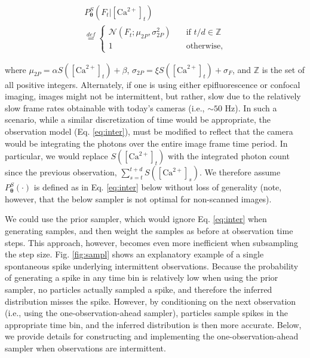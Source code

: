 \documentclass[10pt]{article}
\providecommand{\ve}[1]{\boldsymbol{#1}}
\providecommand{\ve}[1]{\boldsymbol{#1}}
\newcommand{\thetn}{\ve{\theta}}
\newcommand{\p}{P_{\thetn}}
\newcommand{\Ca}{[\text{Ca}^{2+}]}
\begin{document}
\begin{multline}\label{eq:inter}
\p^S(F_t|\Ca_t) \\ \overset{def}{=}
\begin{cases}
\mathcal{N}(F_t; \mu_{2P}, \sigma_{2P}^2) &\quad \text{if } t/d \in \mathbb{Z}\\
1 &\quad \text{otherwise,}
\end{cases}
\end{multline} 

\noindent where $\mu_{2P}= \alpha  S(\Ca_t) + \beta$, $\sigma_{2P}=\xi S(\Ca_t) + \sigma_F$, and  $\mathbb{Z}$ is the set of all positive integers.  Alternately, if one is using either epifluorescence or confocal imaging, images might not be intermittent, but rather, slow due to the relatively slow frame rates obtainable with today's cameras (i.e., $\sim 50$ Hz).  In such a scenario, while a similar discretization of time would be appropriate, the observation model (Eq. \ref{eq:inter}), must be modified to reflect that the camera would be integrating the photons over the entire image frame time period.  
%
%
In particular, we would replace $S(\Ca_t)$ with the integrated photon count since the previous observation, $\sum_{s=t}^{t+d} S(\Ca_s)$.  
We therefore assume $\p^S(\cdot)$ is defined as in Eq. \ref{eq:inter} below without loss of generality (note, however, that the below sampler is not optimal for non-scanned images). %

We could use the prior sampler, which would ignore Eq. \ref{eq:inter} when generating samples, and then weight the samples as before at observation time steps.  This approach, however, becomes even more inefficient when subsampling the step size.  Fig. \ref{fig:sampl} shows an explanatory example of a single spontaneous spike underlying intermittent observations. Because the probability of generating a spike in any time bin is relatively low when using the prior sampler, no particles actually sampled a spike, and therefore the inferred distribution misses the spike. %
However, by conditioning on the next observation (i.e., using the one-observation-ahead sampler), particles sample spikes in the appropriate time bin, and the inferred distribution is then more accurate. Below, we provide details for constructing and implementing the one-observation-ahead sampler when observations are intermittent.
\end{document}
